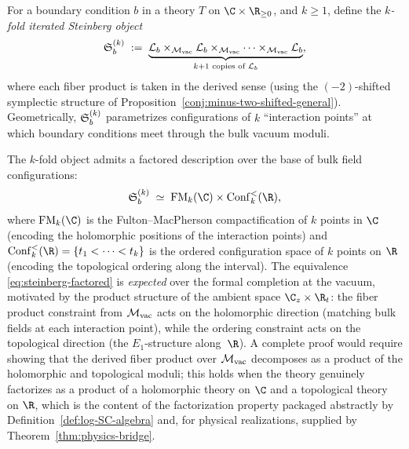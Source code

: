 \begin{construction}
\label{cons:iterated-fiber}
For a boundary condition $b$ in a theory $T$ on $\C \times \R_{\ge
0}$, and $k \ge 1$, define the \emph{$k$-fold iterated Steinberg
object}
\begin{equation}\label{eq:iterated-steinberg}
\mathfrak{S}_b^{(k)}
\;:=\;
\underbrace{
 \mathcal L_b \times_{\mathcal M_{\mathrm{vac}}}
 \mathcal L_b \times_{\mathcal M_{\mathrm{vac}}}
 \cdots \times_{\mathcal M_{\mathrm{vac}}}
 \mathcal L_b
}_{k+1 \text{ copies of } \mathcal L_b},
\end{equation}
where each fiber product is taken in the derived sense (using the
$(-2)$-shifted symplectic structure of
Proposition~\ref{conj:minus-two-shifted-general}). Geometrically,
$\mathfrak{S}_b^{(k)}$ parametrizes configurations of $k$ ``interaction
points'' at which boundary conditions meet through the bulk vacuum
moduli.

The $k$-fold object admits a factored description over the base of
bulk field configurations:
\begin{equation}\label{eq:steinberg-factored}
\Steinb_b^{(k)}
\;\simeq\;
\FM_k(\C) \times \Conf_k^{<}(\R),
\end{equation}
where $\FM_k(\C)$ is the Fulton--MacPherson compactification of
$k$ points in $\C$ (encoding the holomorphic positions of the
interaction points) and $\Conf_k^{<}(\R) = \{t_1 < \cdots < t_k\}$
is the ordered configuration space of $k$ points on $\R$ (encoding
the topological ordering along the interval). The equivalence
\eqref{eq:steinberg-factored} is \emph{expected} over the formal
completion at the vacuum, motivated by the product structure of the
ambient space $\C_z \times \R_t$: the fiber product constraint from
$\mathcal M_{\mathrm{vac}}$ acts on the holomorphic direction (matching
bulk fields at each interaction point), while the ordering
constraint acts on the topological direction (the $E_1$-structure
along~$\R$). A complete proof would require showing that the
derived fiber product over $\mathcal M_{\mathrm{vac}}$ decomposes as a
product of the holomorphic and topological moduli; this holds when
the theory genuinely factorizes as a product of a holomorphic theory
on $\C$ and a topological theory on $\R$, which is the content of
the factorization property packaged abstractly by
Definition~\ref{def:log-SC-algebra} and, for physical realizations,
supplied by Theorem~\ref{thm:physics-bridge}.
\end{construction}

